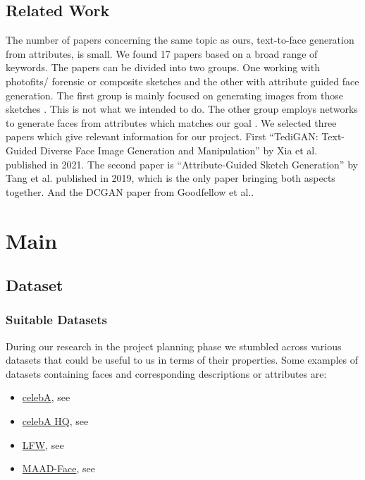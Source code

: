 \documentclass[12pt, a4paper]{article}
\begin{document}
\subsection{Related Work}
The number of papers concerning the same topic as ours, text-to-face generation from attributes, is small. We found 17 papers based on a broad range of keywords.
The papers can be divided into two groups. One working with photofits/ forensic or composite sketches and the other with attribute guided face generation.
The first group is mainly focused on generating images from those sketches \cite{6359918, LEI202013, SANNIDHAN2019452}. This is not what we intended to do. 
The other group employs networks to generate faces from attributes which matches our goal \cite{Xia_2021_CVPR,Lu_2018_ECCV,9117185,9320290,9412022,8462648,Gecer_2018_ECCV,8606936,9146375,Bodla_2018_ECCV,NIPS2016_b1301141,gauthier2014conditional,Xiao_2018_ECCV}.
We selected three papers which give relevant information for our project. First ``TediGAN: Text-Guided Diverse Face Image Generation and Manipulation'' by Xia 
et al. published in 2021\cite{Xia_2021_CVPR}. The second paper is ``Attribute-Guided Sketch Generation'' by Tang et al. published in 2019\cite{Tang}, which is 
the only paper bringing both aspects together. And the DCGAN paper from Goodfellow et al.\cite{dcgan}.

\section{Main}
\subsection{Dataset}
\subsubsection{Suitable Datasets}\label{SuitableDatasets}
During our research in the project planning phase we stumbled across various datasets that could be useful to us in
terms of their properties. Some examples of datasets containing faces and corresponding descriptions or attributes are:
\begin{itemize}
    \item \href{https://mmlab.ie.cuhk.edu.hk/projects/CelebA.html}{celebA}, see \cite{celebA}
    \item \href{http://mmlab.ie.cuhk.edu.hk/projects/CelebA/CelebAMask_HQ.html#:~:text=CelebAMask\%2DHQ\%20is\%20a\%20large,facial\%20attributes\%20corresponding\%20to\%20CelebA}{celebA HQ}, see \cite{CelebAMask-HQ}
    \item \href{http://vis-www.cs.umass.edu/lfw/}{LFW}, see \cite{LFW}
    \item \href{https://github.com/pterhoer/MAAD-Face}{MAAD-Face}, see \cite{DBLP2}
\end{itemize}
\end{document}
